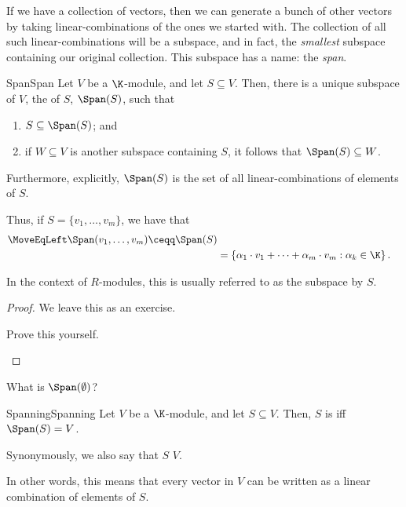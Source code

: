 If we have a collection of vectors, then we can generate a bunch of other vectors by taking linear-combinations of the ones we started with.  The collection of all such linear-combinations will be a subspace, and in fact, the \emph{smallest} subspace containing our original collection.  This subspace has a name:  the \emph{span}.
\begin{thm}{Span}{Span}
	Let $V$ be a $\K$-module, and let $S\subseteq V$.  Then, there is a unique subspace of $V$, the  of $S$, $\Span (S)$, such that
	\begin{enumerate}
		\item $S\subseteq \Span (S)$; and
		\item if $W\subseteq V$ is another subspace containing $S$, it follows that $\Span (S)\subseteq W$.
	\end{enumerate}
	Furthermore, explicitly, $\Span (S)$ is the set of all linear-combinations of elements of $S$.
	\begin{rmk}
		Thus, if $S=\{ v_1,\ldots ,v_m\}$, we have that
		\begin{equation}
			\begin{split}
				\MoveEqLeft
				\Span (v_1,\ldots ,v_m)\ceqq \Span (S) \\
				& =\left\{ \alpha _1\cdot v_1+\cdots +\alpha _m\cdot v_m:\alpha _k\in \K \right\} .
			\end{split}
		\end{equation}
	\end{rmk}
	\begin{rmk}
		In the context of $R$-modules, this is usually referred to as the subspace  by $S$.
	\end{rmk}
	\begin{proof}
		We leave this as an exercise.
		\begin{exr}[breakable=false]{}{}
			Prove this yourself.
		\end{exr}
	\end{proof}
\end{thm}
\begin{exr}{}{}
	What is $\Span (\emptyset )$?
\end{exr}
\begin{dfn}{Spanning}{Spanning}
	Let $V$ be a $\K$-module, and let $S\subseteq V$.  Then, $S$ is  iff $\Span (S)=V$.
	\begin{rmk}
		Synonymously, we also say that $S$  $V$.
	\end{rmk}
	\begin{rmk}
		In other words, this means that every vector in $V$ can be written as a linear combination of elements of $S$.
	\end{rmk}
\end{dfn}

